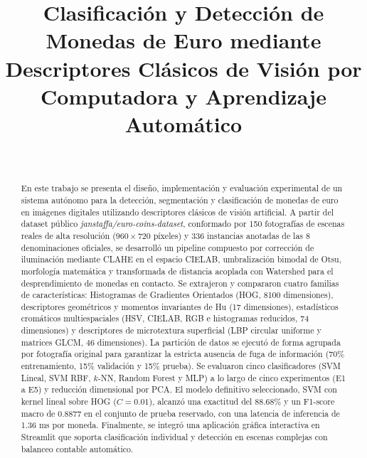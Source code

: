 \documentclass[journal,compsoc,twoside]{IEEEtran}
\begin{document}
\title{Clasificación y Detección de Monedas de Euro mediante Descriptores Clásicos de Visión por Computadora y Aprendizaje Automático}

\author{
    \\
}


\maketitle

\begin{abstract}
En este trabajo se presenta el diseño, implementación y evaluación experimental de un sistema autónomo para la detección, segmentación y clasificación de monedas de euro en imágenes digitales utilizando descriptores clásicos de visión artificial. A partir del dataset público \textit{janstaffa/euro-coins-dataset}, conformado por 150 fotografías de escenas reales de alta resolución ($960 \times 720$ píxeles) y 336 instancias anotadas de las 8 denominaciones oficiales, se desarrolló un pipeline compuesto por corrección de iluminación mediante CLAHE en el espacio CIELAB, umbralización bimodal de Otsu, morfología matemática y transformada de distancia acoplada con Watershed para el desprendimiento de monedas en contacto. Se extrajeron y compararon cuatro familias de características: Histogramas de Gradientes Orientados (HOG, 8100 dimensiones), descriptores geométricos y momentos invariantes de Hu (17 dimensiones), estadísticos cromáticos multiespaciales (HSV, CIELAB, RGB e histogramas reducidos, 74 dimensiones) y descriptores de microtextura superficial (LBP circular uniforme y matrices GLCM, 46 dimensiones). La partición de datos se ejecutó de forma agrupada por fotografía original para garantizar la estricta ausencia de fuga de información (70\% entrenamiento, 15\% validación y 15\% prueba). Se evaluaron cinco clasificadores (SVM Lineal, SVM RBF, $k$-NN, Random Forest y MLP) a lo largo de cinco experimentos (E1 a E5) y reducción dimensional por PCA. El modelo definitivo seleccionado, SVM con kernel lineal sobre HOG ($C=0.01$), alcanzó una exactitud del 88.68\% y un F1-score macro de 0.8877 en el conjunto de prueba reservado, con una latencia de inferencia de 1.36 ms por moneda. Finalmente, se integró una aplicación gráfica interactiva en Streamlit que soporta clasificación individual y detección en escenas complejas con balanceo contable automático.
\end{abstract}
\end{document}
